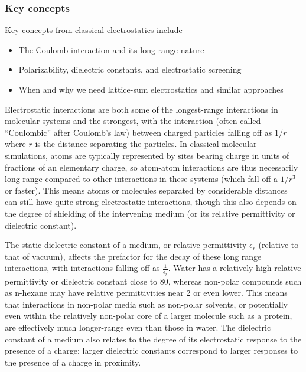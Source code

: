 \documentclass[9pt,bestpractices]{livecoms}
\begin{document}
\subsubsection{Key concepts}
Key concepts from classical electrostatics include
\begin{itemize}
\item The Coulomb interaction and its long-range nature
\item Polarizability, dielectric constants, and electrostatic screening
\item When and why we need lattice-sum electrostatics and similar approaches
\end{itemize}


Electrostatic interactions are both some of the longest-range interactions in molecular systems and the strongest, with the interaction (often called
``Coulombic'' after Coulomb's law) between charged particles falling off as $1/r$ where $r$ is the distance separating the particles. 
In classical molecular simulations, atoms are typically represented by sites bearing charge in units of fractions of an elementary charge, so atom-atom interactions are thus necessarily long range compared to other interactions in these systems (which fall off a $1/r^3$ or faster).  
This means atoms or molecules separated by considerable distances can still have quite strong electrostatic interactions, though this also depends on the degree of shielding of the intervening medium (or its relative permittivity or dielectric constant).

The static dielectric constant of a medium, or relative permittivity $\epsilon_r$ (relative to that of vacuum), affects the prefactor for the decay of these long range interactions, with interactions falling off as $\frac{1}{\epsilon_r}$. 
Water has a relatively high relative permittivity or dielectric constant close to 80, whereas non-polar compounds such as n-hexane may have relative permittivities near 2 or even lower. 
This means that interactions in non-polar media such as non-polar solvents, or potentially even within the relatively non-polar core of a larger molecule such as a protein, are effectively much longer-range even than those in water. 
The dielectric constant of a medium also relates to the degree of its electrostatic response to the presence of a charge; larger dielectric constants correspond to larger responses to the presence of a charge in proximity.
\end{document}
